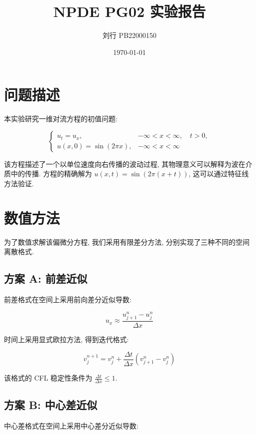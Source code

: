 \documentclass[12pt]{article}
\title{NPDE PG02 实验报告}
\author{刘行 PB22000150}
\date{\today}
\begin{document}
\maketitle

\section{问题描述}

本实验研究一维对流方程的初值问题:

\begin{equation*}
\begin{cases}
u_t = u_x, & -\infty < x < \infty, \quad t > 0, \\
u(x, 0) = \sin(2\pi x), & -\infty < x < \infty
\end{cases}
\end{equation*}

该方程描述了一个以单位速度向右传播的波动过程, 其物理意义可以解释为波在介质中的传播. 方程的精确解为 $u(x, t) = \sin(2\pi (x + t))$, 这可以通过特征线方法验证.

\section{数值方法}

为了数值求解该偏微分方程, 我们采用有限差分方法, 分别实现了三种不同的空间离散格式.

\subsection{方案 A: 前差近似}

前差格式在空间上采用前向差分近似导数:

\begin{equation*}
u_x \approx \frac{u_{j+1}^n - u_j^n}{\Delta x}
\end{equation*}

时间上采用显式欧拉方法, 得到迭代格式:

\begin{equation*}
v_j^{n+1} = v_j^n + \frac{\Delta t}{\Delta x}(v_{j+1}^n - v_j^n)
\end{equation*}

该格式的 CFL 稳定性条件为 $\frac{\Delta t}{\Delta x} \leq 1$.

\subsection{方案 B: 中心差近似}

中心差格式在空间上采用中心差分近似导数:
\end{document}
